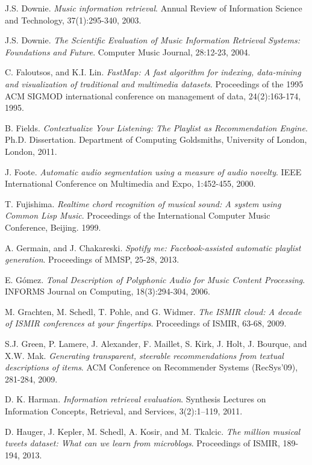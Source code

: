\documentclass[11pt, oneside, openright]{Thesis} %
\begin{document}
\begin{thebibliography}{99}
J.S. Downie.
\textit{Music information retrieval}.
Annual Review of Information Science and Technology, 37(1):295-340, 2003.

J.S. Downie.
\textit{The Scientific Evaluation of Music Information Retrieval Systems: Foundations and Future}. 
Computer Music Journal, 28:12-23, 2004.

C. Faloutsos, and K.I. Lin. 
\textit{FastMap: A fast algorithm for indexing, data-mining and visualization of traditional and multimedia datasets}.
Proceedings of the 1995 ACM SIGMOD international conference on management of data, 24(2):163-174, 1995.

B. Fields.
\textit{Contextualize Your Listening: The Playlist as Recommendation Engine}.
Ph.D. Dissertation. Department of Computing Goldsmiths, University of London, London, 2011.

J. Foote.
\textit{Automatic audio segmentation using a measure of audio novelty}.
IEEE International Conference on Multimedia and Expo, 1:452-455, 2000.

T. Fujishima.
\textit{Realtime chord recognition of musical sound: A system using Common Lisp Music}.
Proceedings of the International Computer Music Conference, Beijing. 1999.

A. Germain, and J. Chakareski.
\textit{Spotify me: Facebook-assisted automatic playlist generation}.
Proceedings of MMSP, 25-28, 2013.

E. Gómez.
\textit{Tonal Description of Polyphonic Audio for Music Content Processing}.
INFORMS Journal on Computing, 18(3):294-304, 2006.

M. Grachten, M. Schedl, T. Pohle, and G. Widmer.
\textit{The ISMIR cloud: A decade of ISMIR conferences at your fingertips}.
Proceedings of ISMIR, 63-68, 2009.

S.J. Green, P. Lamere, J. Alexander, F. Maillet, S. Kirk, J. Holt, J. Bourque, and X.W. Mak.
\textit{Generating transparent, steerable recommendations from textual descriptions of items}.
ACM Conference on Recommender Systems (RecSys'09), 281-284, 2009.

D. K. Harman. 
\textit{Information retrieval evaluation}. 
Synthesis Lectures on Information Concepts, Retrieval, and Services, 3(2):1–119, 2011.

D. Hauger, J. Kepler, M. Schedl, A. Kosir, and M. Tkalcic.
\textit{The million musical tweets dataset: What can we learn from microblogs}.
Proceedings of ISMIR, 189-194, 2013.


\end{thebibliography}
\end{document}
